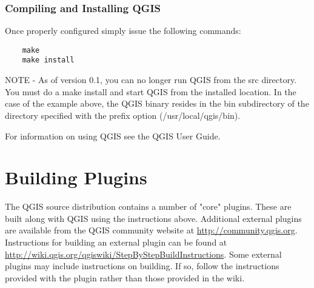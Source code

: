   \subsubsection{Compiling and Installing QGIS}
  Once properly configured simply issue the following commands:
  \begin{verbatim}
    make
    make install
  \end{verbatim}
NOTE - As of version 0.1, you can no longer run QGIS from the src directory. You must do a make install and start QGIS from the installed location. In the case of the example above, the QGIS binary resides in the bin subdirectory of the directory specified with the prefix option (/usr/local/qgis/bin).

For information on using QGIS see the QGIS User Guide.

\section{Building Plugins}
The QGIS source distribution contains a number of "core" plugins. These are built along with QGIS using the instructions above. Additional external plugins are available from the QGIS community website at \url{http://community.qgis.org}. Instructions for building an external plugin can be found at \url{http://wiki.qgis.org/qgiswiki/StepByStepBuildInstructions}. Some external plugins may include instructions on building. If so, follow the instructions provided with the plugin rather than those provided in the wiki. 